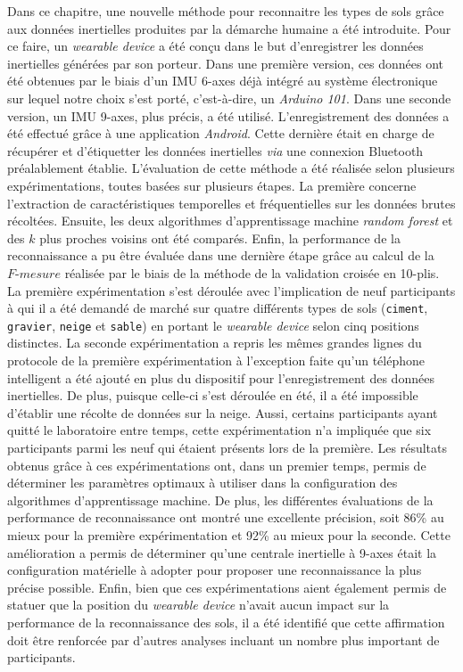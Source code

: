 Dans ce chapitre, une nouvelle méthode pour reconnaitre les types de sols grâce aux données inertielles produites par la démarche humaine a été introduite. Pour ce faire, un \textit{wearable device} a été conçu dans le but d'enregistrer les données inertielles générées par son porteur. Dans une première version, ces données ont été obtenues par le biais d'un \acs{IMU} 6-axes déjà intégré au système électronique sur lequel notre choix s'est porté, c'est-à-dire, un \textit{Arduino 101}. Dans une seconde version, un \acs{IMU} 9-axes, plus précis, a été utilisé. L'enregistrement des données a été effectué grâce à une application \textit{Android}. Cette dernière était en charge de récupérer et d'étiquetter les données inertielles \textit{via} une connexion Bluetooth préalablement établie. L'évaluation de cette méthode a été réalisée selon plusieurs expérimentations, toutes basées sur plusieurs étapes. La première concerne l'extraction de caractéristiques temporelles et fréquentielles sur les données brutes récoltées. Ensuite, les deux algorithmes d'apprentissage machine \textit{random forest} et des $k$ plus proches voisins ont été comparés. Enfin, la performance de la reconnaissance a pu être évaluée dans une dernière étape grâce au calcul de la $F\mbox{-} mesure$ réalisée par le biais de la méthode de la validation croisée en 10-plis. La première expérimentation s'est déroulée avec l'implication de neuf participants à qui il a été demandé de marché sur quatre différents types de sols (\texttt{ciment}, \texttt{gravier}, \texttt{neige} et \texttt{sable}) en portant le \textit{wearable device} selon cinq positions distinctes. La seconde expérimentation a repris les mêmes grandes lignes du protocole de la première expérimentation à l'exception faite qu'un téléphone intelligent a été ajouté en plus du dispositif pour l'enregistrement des données inertielles. De plus, puisque celle-ci s'est déroulée en été, il a été impossible d'établir une récolte de données sur la neige. Aussi, certains participants ayant quitté le laboratoire entre temps, cette expérimentation n'a impliquée que six participants parmi les neuf qui étaient présents lors de la première. Les résultats obtenus grâce à ces expérimentations ont, dans un premier temps, permis de déterminer les paramètres optimaux à utiliser dans la configuration des algorithmes d'apprentissage machine. De plus, les différentes évaluations de la performance de reconnaissance ont montré une excellente précision, soit 86\% au mieux pour la première expérimentation et 92\% au mieux pour la seconde. Cette amélioration a permis de déterminer qu'une centrale inertielle à 9-axes était la configuration matérielle à adopter pour proposer une reconnaissance la plus précise possible. Enfin, bien que ces expérimentations aient également permis de statuer que la position du \textit{wearable device} n'avait aucun impact sur la performance de la reconnaissance des sols, il a été identifié que cette affirmation doit être renforcée par d'autres analyses incluant un nombre plus important de participants.
